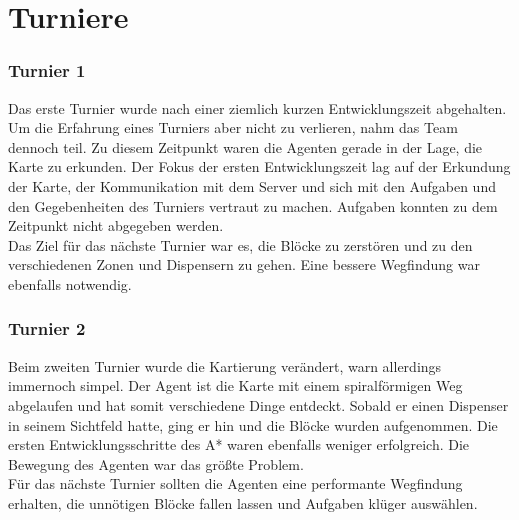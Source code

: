 \section{Turniere}

\subsubsection{Turnier 1}
Das erste Turnier wurde nach einer ziemlich kurzen Entwicklungszeit abgehalten. Um die Erfahrung eines Turniers aber nicht zu verlieren, nahm das Team dennoch teil. Zu diesem Zeitpunkt waren die Agenten gerade in der Lage, die Karte zu erkunden. Der Fokus der ersten Entwicklungszeit lag auf der Erkundung der Karte, der Kommunikation mit dem Server und sich mit den Aufgaben und den Gegebenheiten des Turniers vertraut zu machen. Aufgaben konnten zu dem Zeitpunkt nicht abgegeben werden.\\
Das Ziel für das nächste Turnier war es, die Blöcke zu zerstören und zu den verschiedenen Zonen und Dispensern zu gehen. Eine bessere Wegfindung war ebenfalls notwendig.

%

\subsubsection{Turnier 2}
Beim zweiten Turnier wurde die Kartierung verändert, warn allerdings immernoch simpel. Der Agent ist die Karte mit einem spiralförmigen Weg abgelaufen und hat somit verschiedene Dinge entdeckt. Sobald er einen Dispenser in seinem Sichtfeld hatte, ging er hin und die Blöcke wurden aufgenommen. Die ersten Entwicklungsschritte des A* waren ebenfalls weniger erfolgreich. Die Bewegung des Agenten war das größte Problem. \\
Für das nächste Turnier sollten die Agenten eine performante Wegfindung erhalten, die unnötigen Blöcke fallen lassen und Aufgaben klüger auswählen.

